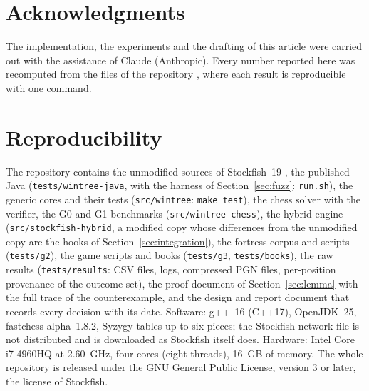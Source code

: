 \documentclass{article}
\theoremstyle{plain}
\theoremstyle{definition}
\theoremstyle{remark}
\newcommand{\code}[1]{\texttt{#1}}
\begin{document}
\section*{Acknowledgments}
The implementation, the experiments and the drafting of this article were carried out with the assistance of Claude (Anthropic). Every number reported here was recomputed from the files of the repository \cite{wintreechess}, where each result is reproducible with one command.

\appendix
\section{Reproducibility}

The repository \cite{wintreechess} contains the unmodified sources of Stockfish~19 \cite{stockfish}, the published Java (\code{tests/wintree-java}, with the harness of Section~\ref{sec:fuzz}: \code{run.sh}), the generic cores and their tests (\code{src/wintree}: \code{make test}), the chess solver with the verifier, the G0 and G1 benchmarks (\code{src/wintree-chess}), the hybrid engine (\code{src/stockfish-hybrid}, a modified copy whose differences from the unmodified copy are the hooks of Section~\ref{sec:integration}), the fortress corpus and scripts (\code{tests/g2}), the game scripts and books (\code{tests/g3}, \code{tests/books}), the raw results (\code{tests/results}: CSV files, logs, compressed PGN files, per-position provenance of the outcome set), the proof document of Section~\ref{sec:lemma} with the full trace of the counterexample, and the design and report document that records every decision with its date. Software: g++~16 (C++17), OpenJDK~25, fastchess alpha~1.8.2, Syzygy tables up to six pieces; the Stockfish network file is not distributed and is downloaded as Stockfish itself does. Hardware: Intel Core i7-4960HQ at 2.60~GHz, four cores (eight threads), 16~GB of memory. The whole repository is released under the GNU General Public License, version 3 or later, the license of Stockfish.



\end{document}

